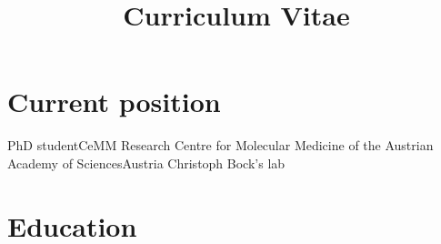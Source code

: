 \documentclass[11pt,a4paper,roman]{moderncv} %
\title{Curriculum Vitae}
\begin{document}
\makecvtitle %


\section{Current position}
    {PhD student}{CeMM Research Centre for Molecular Medicine of the Austrian Academy of Sciences}{Austria}
    {Christoph Bock's lab}{}


\section{Education}


\end{document}
